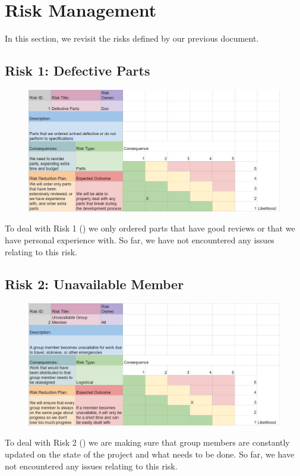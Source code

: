 
\section{Risk Management}
\label{sec:risk_management}


In this section, we revisit the risks defined by our previous document.\

\subsection{Risk 1: Defective Parts}
\begin{figure}[h!]
\centering
\includegraphics[width=0.98\columnwidth]{risks/risk1.JPG}
\label{fig:risk1}
\end{figure}
To deal with Risk 1 () we only ordered parts that have good reviews or that we have personal experience with. So far, we have not encountered any issues relating to this risk.

\subsection{Risk 2: Unavailable Member}
\begin{figure}[h!]
\centering
\includegraphics[width=0.98\columnwidth]{risks/risk2.JPG}
\label{fig:risk2}
\end{figure}
To deal with Risk 2 () we are making sure that group members are constantly updated on the state of the project and what needs to be done. So far, we have not encountered any issues relating to this risk.

